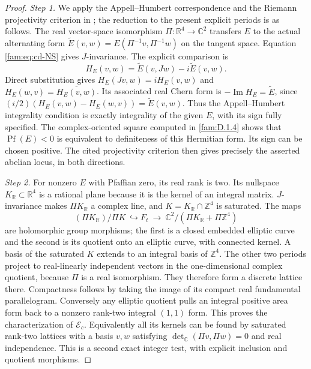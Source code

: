 \documentclass[11pt,a4paper]{article}
\theoremstyle{plain}
\theoremstyle{definition}
\begin{document}
\begin{proof}
\par\noindent\textit{Step 1.} We apply the Appell--Humbert correspondence and the Riemann projectivity
criterion in \cite[Theorems 4.1 and 4.4]{Schnell19}; the reduction to the
present explicit periods is as follows. The real vector-space isomorphism
$\Pi:\mathbb R^4\to\mathbb C^2$ transfers $E$ to the actual alternating
form $\widetilde E(v,w)=E(\Pi^{-1}v,\Pi^{-1}w)$ on the tangent space.
Equation \eqref{fam:eq:cd-NS} gives $J$-invariance. The explicit comparison is
\[
 H_E(v,w)=\widetilde E(v,Jw)-i\widetilde E(v,w).
\]
Direct substitution gives $H_E(Jv,w)=iH_E(v,w)$ and
$H_E(w,v)=\overline{H_E(v,w)}$. Its associated real Chern form is
$-\operatorname{Im}H_E=\widetilde E$, since
$(i/2)(H_E(v,w)-H_E(w,v))=\widetilde E(v,w)$.
Thus the Appell--Humbert integrality condition is exactly integrality
of the given $E$, with its sign fully specified. The complex-oriented square computed in \ref{fam:D.1.4} shows that
$\operatorname{Pf}(E)<0$ is equivalent to definiteness of this Hermitian
form. Its sign can be chosen positive. The cited projectivity criterion
then gives precisely the asserted abelian locus, in both directions.

\par\noindent\textit{Step 2.} For nonzero $E$ with Pfaffian zero, its real rank is two. Its nullspace
$K_{\mathbb R}\subset\mathbb R^4$ is a rational plane because it is the
kernel of an integral matrix. $J$-invariance makes $\Pi K_{\mathbb R}$ a
complex line, and $K=K_{\mathbb R}\cap\mathbb Z^4$ is saturated. The maps
\[
 (\Pi K_{\mathbb R})/\Pi K\ \hookrightarrow F_t
 \ \longrightarrow\
 \mathbb C^2/(\Pi K_{\mathbb R}+\Pi\mathbb Z^4)
\]
are holomorphic group morphisms; the first is a closed embedded elliptic
curve and the second is its quotient onto an elliptic curve, with
connected kernel. A basis of the saturated $K$ extends to an integral basis of $\mathbb Z^4$.
The other two periods project to real-linearly independent vectors in the
one-dimensional complex quotient, because $\Pi$ is a real isomorphism.
They therefore form a discrete lattice there. Compactness follows by
taking the image of its compact real fundamental parallelogram. Conversely any elliptic quotient
pulls an integral positive area form back to a nonzero rank-two integral
$(1,1)$ form. This proves the characterization of $\mathcal E_c$.
Equivalently all its kernels can be found by saturated rank-two lattices
with a basis $v,w$ satisfying
$\det_{\mathbb C}(\Pi v,\Pi w)=0$ and real independence. This is a second
exact integer test, with explicit inclusion and quotient morphisms.


\end{proof}
\end{document}
